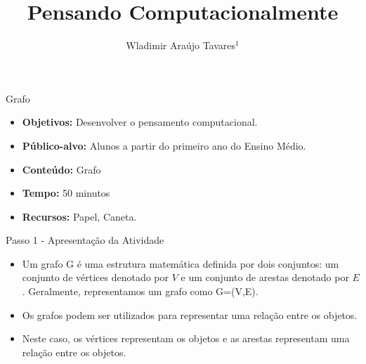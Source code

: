 \documentclass{beamer}
\title {Pensando Computacionalmente}
\author[Wladimir Araújo Tavares]{ Wladimir Araújo Tavares$^{1}$  }
\institute[UFC]{$^{1}$Universidade Federal do Ceará - Campus de Quixadá\\}
\date{}
\begin{document}
\begin{frame}
	\titlepage
\end{frame}




\begin{frame}{Grafo}

\begin{itemize}
\item \textbf{Objetivos:} Desenvolver o pensamento computacional.

\item \textbf{Público-alvo:}  Alunos a partir do primeiro ano do Ensino Médio.

\item \textbf{Conteúdo:} Grafo

\item \textbf{Tempo:} 50 minutos

\item \textbf{Recursos:} Papel, Caneta.

\end{itemize}
    
\end{frame}


\begin{frame}{Passo 1 - Apresentação da Atividade}

\begin{itemize}
   
\item <1-> Um grafo G é uma estrutura matemática definida por dois conjuntos: um conjunto de vértices denotado por $V$ e um conjunto de arestas denotado por $E$. Geralmente, representamos um grafo como G=(V,E).


\item Os grafos podem ser utilizados para representar uma relação entre os objetos. 

\item Neste caso, os vértices representam os objetos e as arestas representam uma relação entre os objetos. 
\end{itemize}

\end{frame}
\end{document}
